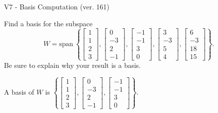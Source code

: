 \begin{exercise}
  \begin{exerciseTitle}V7 - Basis Computation (ver. 161)\end{exerciseTitle}
  \begin{exerciseStatement}
    Find a basis for the subspace 
\[W=\mathrm{span}\ \left\{\left[\begin{array}{r}
1 \\
1 \\
2 \\
3
\end{array}\right] , \left[\begin{array}{r}
0 \\
-3 \\
2 \\
-1
\end{array}\right] , \left[\begin{array}{r}
-1 \\
-1 \\
3 \\
0
\end{array}\right] , \left[\begin{array}{r}
3 \\
-3 \\
5 \\
4
\end{array}\right] , \left[\begin{array}{r}
6 \\
-3 \\
18 \\
15
\end{array}\right]\right\}.\]
 Be sure to explain why your result is a basis.


  \end{exerciseStatement}
  \begin{exerciseAnswer}
   A basis of \(W\) is  \(\left\{\left[\begin{array}{r}
1 \\
1 \\
2 \\
3
\end{array}\right] , \left[\begin{array}{r}
0 \\
-3 \\
2 \\
-1
\end{array}\right] , \left[\begin{array}{r}
-1 \\
-1 \\
3 \\
0
\end{array}\right]\right\}\).
  


  \end{exerciseAnswer}
\end{exercise}